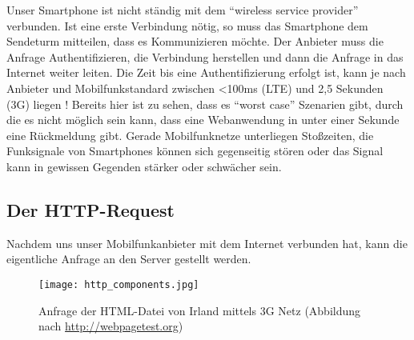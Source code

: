 			Unser Smartphone ist nicht ständig mit dem "`wireless service provider"' verbunden. Ist eine erste Verbindung nötig, so muss das Smartphone dem Sendeturm mitteilen, dass es Kommunizieren möchte. Der Anbieter muss die Anfrage Authentifizieren, die Verbindung herstellen und dann die Anfrage in das Internet weiter leiten. Die Zeit bis eine Authentifizierung erfolgt ist, kann je nach Anbieter und Mobilfunkstandard zwischen <100ms (LTE) und 2,5 Sekunden (3G) liegen \autocite{grigorikRadio}! Bereits hier ist zu sehen, dass es "`worst case"' Szenarien gibt, durch die es nicht möglich sein kann, dass eine Webanwendung in unter einer Sekunde eine Rückmeldung gibt. Gerade Mobilfunknetze unterliegen Stoßzeiten, die Funksignale von Smartphones können sich gegenseitig stören oder das Signal kann in gewissen Gegenden stärker oder schwächer sein.



		\subsection{Der HTTP-Request} %
		\label{sub:der_http_request_komponente}
			Nachdem uns unser Mobilfunkanbieter mit dem Internet verbunden hat, kann die eigentliche Anfrage an den Server gestellt werden.

			\begin{figure}[htbp]
				\begin{center}
					\texttt{[image: http\_components.jpg]}
					\caption{Anfrage der HTML-Datei von Irland mittels 3G Netz (Abbildung nach \url{http://webpagetest.org})}
					\label{fig:http_components}
				\end{center}
			\end{figure}

